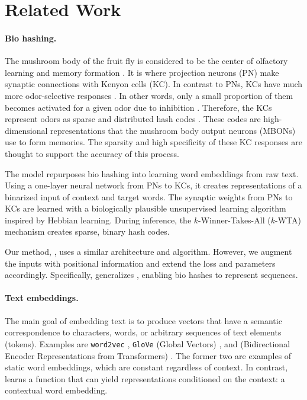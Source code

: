 \section{Related Work}

\paragraph{Bio hashing.}
The mushroom body of the fruit fly is considered to be the center of olfactory learning and memory formation \cite{doi:10.1126/science.8303280}. 
It is where projection neurons (PN) make synaptic connections with Kenyon cells (KC).
In contrast to PNs, KCs have much more odor-selective responses \cite{turner2008olfactory, honegger2011cellular}.
In other words, only a small proportion of them becomes activated for a given odor due to inhibition \cite{lin2014sparse, papadopoulou2011normalization}.
Therefore, the KCs represent odors as sparse and distributed hash codes \cite{lin2014sparse}.
These codes are high-dimensional representations that the mushroom body output neurons (MBONs) use to form memories.
The sparsity and high specificity of these KC responses are thought to support the accuracy of this process\cite{laurent2002olfactory}. 

\par
The \flyvec\cite{flyvec} model repurposes bio hashing into learning word embeddings from raw text.
Using a one-layer neural network from PNs to KCs, it creates representations of a binarized input of context and target words.
The synaptic weights from PNs to KCs are learned with a biologically plausible unsupervised learning algorithm \cite{hopfield} inspired by Hebbian learning.
During inference, the $k$-Winner-Takes-All ($k$-WTA) mechanism creates sparse, binary hash codes.

\par
Our method, \methodname, uses a similar architecture and algorithm.
However, we augment the inputs with positional information and extend the loss and parameters accordingly.
Specifically, \methodname generalizes \flyvec, enabling bio hashes to represent sequences.

\paragraph{Text embeddings.}
The main goal of embedding text is to produce vectors that have a semantic correspondence to characters, words, or arbitrary sequences of text elements (tokens).
Examples are \texttt{word2vec} \cite{word2vec}, \texttt{GloVe} (Global Vectors) \cite{glove}, and \bert (Bidirectional Encoder Representations from Transformers) \cite{bert}.
The former two are examples of static word embeddings, which are constant regardless of context.
In contrast, \bert learns a function that can yield representations conditioned on the context: a contextual word embedding.

